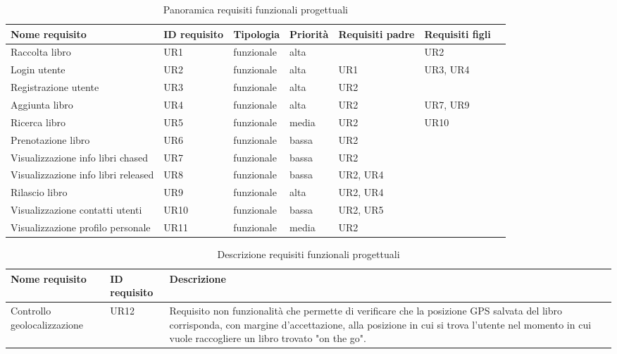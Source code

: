 \begin{table}
\caption{Panoramica requisiti funzionali progettuali}
\label{tab:Req_utente}
\centering
\begin{tabular}{|l|l|l|l|l|l|r}
	\hline\hline
	\textbf{Nome requisito} & \textbf{ID requisito} & \textbf{Tipologia} & \textbf{Priorità} & \textbf{Requisiti padre} & \textbf{Requisiti figli} \\
	\hline\hline
	Raccolta libro & UR1 & funzionale & alta & & UR2\\
	\hline
	Login utente & UR2 & funzionale & alta & UR1 & UR3, UR4\\
	\hline
	Registrazione utente & UR3 & funzionale & alta & UR2 & \\
	\hline
	Aggiunta libro & UR4 & funzionale & alta & UR2 & UR7, UR9 \\
	\hline
	Ricerca libro & UR5 & funzionale & media & UR2 & UR10 \\
	\hline
	Prenotazione libro & UR6 & funzionale & bassa & UR2 &\\
	\hline
	Visualizzazione info libri chased & UR7 & funzionale & bassa & UR2 &\\
	\hline
	Visualizzazione info libri released & UR8 & funzionale & bassa & UR2, UR4 &\\
	\hline
	Rilascio libro & UR9 & funzionale & alta & UR2, UR4 &\\
	\hline
	Visualizzazione contatti utenti & UR10 & funzionale & bassa & UR2, UR5 &\\
	\hline
	Visualizzazione profilo personale  & UR11 & funzionale & media & UR2 &\\
	\hline
\end{tabular}
\end{table}

\begin{table}
	
	\caption{Descrizione requisiti funzionali progettuali}
	\label{tab:Req_utente_descrizione}
	\centering
	\begin{tabular}{|l|l|l}
		\hline\hline
		\textbf{Nome requisito} & \textbf{ID requisito} & \textbf{Descrizione} \\
		\hline\hline
		Controllo geolocalizzazione & UR12 & Requisito non funzionalità che permette di verificare che la posizione GPS
		salvata del libro corrisponda, con margine d'accettazione, alla posizione 
		in cui si trova l'utente nel momento in cui vuole raccogliere
		un libro trovato "on the go".\\
		\hline
	\end{tabular}
\end{table}